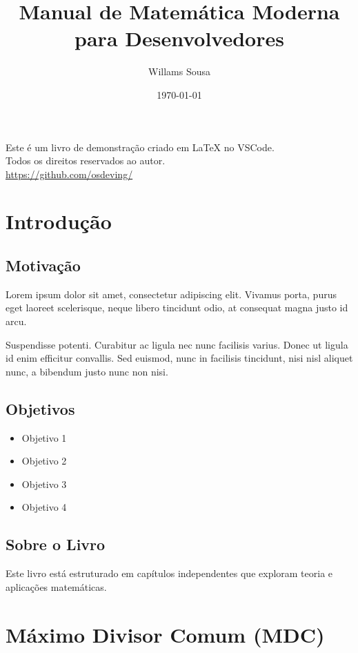 \documentclass[12pt]{book}
\title{\Huge\textbf{Manual de Matemática Moderna\\para Desenvolvedores}}
\author{Willams Sousa}
\date{\today}
\begin{document}
\maketitle
\thispagestyle{empty}
\newpage

\begin{titlepage}
  \centering
  \vspace*{4cm}
  {\Large Este é um livro de demonstração criado em LaTeX no VSCode.}\\[1cm]
  {\large Todos os direitos reservados ao autor.}\\[1cm]
  {\small \url{https://github.com/osdeving/}}
\end{titlepage}

\newpage
\tableofcontents
\newpage

\chapter{Introdução}
\section{Motivação}
Lorem ipsum dolor sit amet, consectetur adipiscing elit. Vivamus porta, purus eget laoreet scelerisque, neque libero tincidunt odio, at consequat magna justo id arcu.

Suspendisse potenti. Curabitur ac ligula nec nunc facilisis varius. Donec ut ligula id enim efficitur convallis. Sed euismod, nunc in facilisis tincidunt, nisi nisl aliquet nunc, a bibendum justo nunc non nisi.

\section{Objetivos}
\begin{itemize}
    \item Objetivo 1
    \item Objetivo 2
    \item Objetivo 3
    \item Objetivo 4
\end{itemize}

\section{Sobre o Livro}
Este livro está estruturado em capítulos independentes que exploram teoria e aplicações matemáticas.

\chapter{Máximo Divisor Comum (MDC)}
\end{document}
